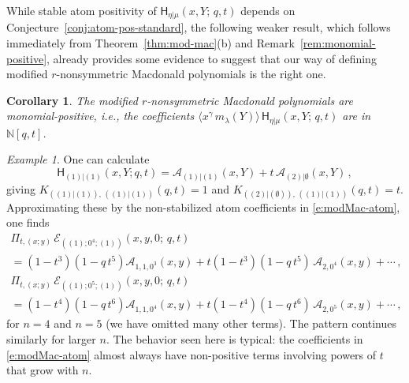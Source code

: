 \documentclass[12pt]{amsart}
\newtheorem{cor}[thm]{Corollary}
\theoremstyle{definition}
\theoremstyle{remark}
\newtheorem{example}[thm]{Example}
\newcommand{\NN}{{\mathbb N}}
\newcommand{\Acal}{{\mathcal A}}
\newcommand{\Ecal}{{\mathcal E}}
\newcommand{\mE}{\mathsf H}   %
\begin{document}
While stable atom positivity of $\mE _{\eta |\mu }(x,Y;\, q,t)$
depends on Conjecture~\ref{conj:atom-pos-standard}, the following
weaker result, which follows immediately from
Theorem~\ref{thm:mod-mac}(b) and Remark~\ref{rem:monomial-positive},
already provides some evidence to suggest that our way of defining
modified $r$-nonsymmetric Macdonald polynomials is the right one.

\begin{cor}\label{cor}
The modified $r$-nonsymmetric Macdonald polynomials are monomial-positive,
i.e., the coefficients $\langle x^{\gamma }\, m_{\lambda }(Y) \rangle\,
\mE _{\eta |\mu }(x,Y;\, q,t)$ are in $\NN [q,t]$.
\end{cor}



\begin{example}\label{ex:K-stable}
One can calculate
\begin{equation}\label{e:K-stable-ex}
\mE _{(1)|(1)}(x,Y;q,t) = \Acal _{(1)|(1)}(x,Y) + t\, \Acal
_{(2)|\emptyset }(x,Y)\, ,
\end{equation}
giving $K_{((1)|(1)),\, ((1)|(1))}(q,t) = 1$ and $K_{((2)|(\emptyset
)),\, ((1)|(1))}(q,t) = t$.  Approximating these by the non-stabilized
atom coefficients in \eqref{e:modMac-atom}, one finds
\begin{multline}\label{e:K-approx-n=4}
\Pi _{t,(x;y)}\, \Ecal _{((1) ;0^{4};(1) )}(x,y, 0;\, q,t) \\
= (1-t^{3})(1-q\, t^{5}) \Acal _{1,1,0^{3}}(x,y) + t (1-t^{3})(1-q\,
t^{5})\, \Acal _{2,0^{4}}(x,y)+\cdots \, ,
\end{multline}
\begin{multline}\label{e:K-approx-n=5}
\Pi _{t,(x;y)}\, \Ecal _{((1) ;0^{5};(1) )}(x,y, 0;\, q,t)\\
 = (1-t^{4})(1-q\, t^{6}) \Acal _{1,1,0^{4}}(x,y) + t (1-t^{4})(1-q\,
t^{6})\, \Acal _{2,0^{5}}(x,y)+\cdots \, ,
\end{multline}
for $n=4$ and $n=5$ (we have omitted many other terms).  The pattern
continues similarly for larger $n$.  The behavior seen here is
typical: the coefficients in \eqref{e:modMac-atom} almost always
have non-positive terms involving powers of $t$ that grow with $n$.
\end{example}
\end{document}
